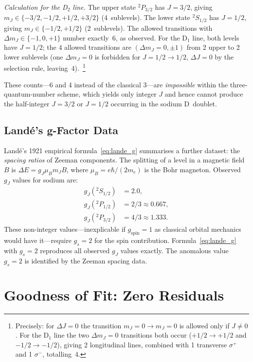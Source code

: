 \documentclass[12pt]{article}
\begin{document}
\noindent \emph{Calculation for the D$_2$ line.}
The upper state $^2P_{3/2}$ has $J=3/2$, giving $m_J \in
\{-3/2,-1/2,+1/2,+3/2\}$ (4~sublevels).  The lower state $^2S_{1/2}$
has $J=1/2$, giving $m_J\in\{-1/2,+1/2\}$ (2~sublevels).  The allowed
transitions with $\Delta m_J \in \{-1,0,+1\}$ number exactly~6, as observed.
For the D$_1$ line, both levels have $J=1/2$; the 4 allowed transitions
are $(\Delta m_J = 0, \pm1)$ from 2 upper to 2 lower sublevels
(one $\Delta m_J = 0$ is forbidden for $J=1/2\to1/2$, $\Delta J=0$
by the selection rule, leaving~4).~\footnote{Precisely: for $\Delta J = 0$
the transition $m_J=0 \to m_J=0$ is allowed only if $J \neq 0$.  For
the D$_1$ line the two $\Delta m_J=0$ transitions both occur ($+1/2\to+1/2$
and $-1/2\to-1/2$), giving 2 longitudinal lines, combined with 1 transverse
$\sigma^+$ and 1 $\sigma^-$, totalling~4.}

These counts---6 and 4 instead of the classical 3---are \emph{impossible}
within the three-quantum-number scheme, which yields only integer $J$ and
hence cannot produce the half-integer $J=3/2$ or $J=1/2$ occurring in
the sodium D~doublet.

\subsection{Landé's g-Factor Data}

Landé's 1921 empirical formula~\eqref{eq:lande_g} summarises a further
dataset: the \emph{spacing ratios} of Zeeman components.  The splitting
of a level in a magnetic field $B$ is $\Delta E = g_J \mu_B m_J B$, where
$\mu_B = e\hbar/(2m_e)$ is the Bohr magneton.  Observed $g_J$ values
for sodium are:
\begin{align*}
  g_J({}^2S_{1/2}) &= 2.0, \\
  g_J({}^2P_{1/2}) &= 2/3 \approx 0.667, \\
  g_J({}^2P_{3/2}) &= 4/3 \approx 1.333.
\end{align*}
These non-integer values---inexplicable if $g_{\mathrm{spin}} = 1$ as classical
orbital mechanics would have it---require $g_s = 2$ for the spin contribution.
Formula~\eqref{eq:lande_g} with $g_s = 2$ reproduces all observed $g_J$
values exactly.  The anomalous value $g_s = 2$ is identified by the Zeeman
spacing data.

\section{Goodness of Fit: Zero Residuals}
\label{sec:fit}
\end{document}
